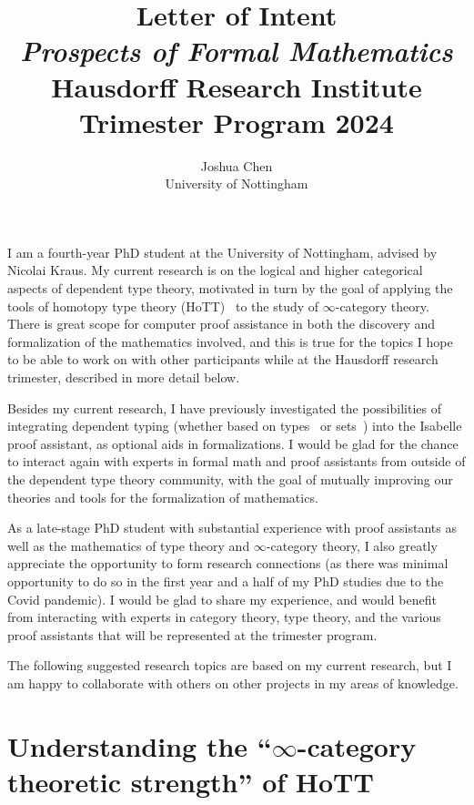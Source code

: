 \documentclass[a4paper]{article}
\title{
    \Large Letter of Intent \\
    {\normalsize \emph{Prospects of Formal Mathematics}} \\
    {\normalsize Hausdorff Research Institute Trimester Program 2024}
}
\author{
    Joshua Chen \\
    {\normalsize University of Nottingham}
}
\date{}
\begin{document}
\maketitle

I am a fourth-year PhD student at the University of Nottingham, advised by Nicolai Kraus.
My current research is on the logical and higher categorical aspects of dependent type theory, motivated in turn by the goal of applying the tools of homotopy type theory (HoTT)~\cite{hott-book} to the study of $\infty$-category theory.
There is great scope for computer proof assistance in both the discovery and formalization of the mathematics involved, and this is true for the topics I hope to be able to work on with other participants while at the Hausdorff research trimester, described in more detail below.

Besides my current research, I have previously investigated the possibilities of integrating dependent typing (whether based on types~\cite{chen:19:implementation,chen:21:isabelle-hott} or sets~\cite{ckkk:21:isabelle-set}) into the Isabelle proof assistant, as optional aids in formalizations.
I would be glad for the chance to interact again with experts in formal math and proof assistants from outside of the dependent type theory community, with the goal of mutually improving our theories and tools for the formalization of mathematics.

As a late-stage PhD student with substantial experience with proof assistants as well as the mathematics of type theory and $\infty$-category theory, I also greatly appreciate the opportunity to form research connections (as there was minimal opportunity to do so in the first year and a half of my PhD studies due to the Covid pandemic).
I would be glad to share my experience, and would benefit from interacting with experts in category theory, type theory, and the various proof assistants that will be represented at the trimester program.

The following suggested research topics are based on my current research, but I am happy to collaborate with others on other projects in my areas of knowledge.

\section*{Understanding the ``$\infty$-category theoretic strength'' of HoTT}
\end{document}
